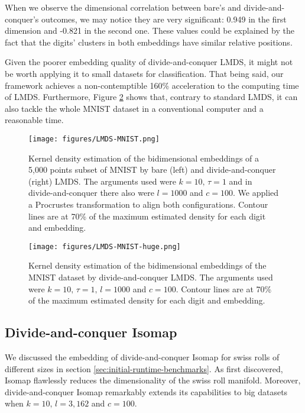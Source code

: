 When we observe the dimensional correlation between bare's and divide-and-conquer's outcomes, we may notice they are very significant: 0.949 in the first dimension and -0.821 in the second one. These values could be explained by the fact that the digits' clusters in both embeddings have similar relative positions.

Given the poorer embedding quality of divide-and-conquer LMDS, it might not be worth applying it to small datasets for classification. That being said, our framework achieves a non-contemptible 160\% acceleration to the computing time of LMDS. Furthermore, Figure \ref{fig:LMDS-MNIST-huge} shows that, contrary to standard LMDS, it can also tackle the whole MNIST dataset in a conventional computer and a reasonable time.

\begin{figure}
    \centering
    \texttt{[image: figures/LMDS-MNIST.png]}
    \caption{Kernel density estimation of the bidimensional embeddings of a 5,000 points subset of MNIST \citep{Cohen2017} by bare (left) and divide-and-conquer (right) LMDS. The arguments used were $k=10,\, \tau = 1$ and in divide-and-conquer there also were $l=1000$ and $c=100$. We applied a Procrustes transformation to align both configurations. Contour lines are at 70\% of the maximum estimated density for each digit and embedding.}
    \label{fig:LMDS-MNIST}
\end{figure}

\begin{figure}
    \centering
    \texttt{[image: figures/LMDS-MNIST-huge.png]}
    \caption{Kernel density estimation of the bidimensional embeddings of the MNIST dataset \citep{Cohen2017} by divide-and-conquer LMDS. The arguments used were $k=10,\, \tau = 1, \, l=1000$ and $c=100$. Contour lines are at 70\% of the maximum estimated density for each digit and embedding.}
    \label{fig:LMDS-MNIST-huge}
\end{figure}

\subsection{Divide-and-conquer Isomap}

We discussed the embedding of divide-and-conquer Isomap for swiss rolls of different sizes in section \ref{sec:initial-runtime-benchmarks}. As \citet{Spiwokv2007} first discovered, Isomap flawlessly reduces the dimensionality of the swiss roll manifold. Moreover, divide-and-conquer Isomap remarkably extends its capabilities to big datasets when $k=10,\, l=3,162$ and $c=100$.

